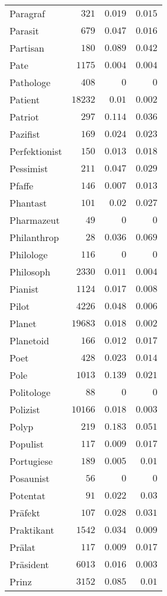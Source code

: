 \begin{supertabular}{lrrr}
Paragraf & $321$ & $0.019$ & $0.015$ \\
Parasit & $679$ & $0.047$ & $0.016$ \\
Partisan & $180$ & $0.089$ & $0.042$ \\
Pate & $1175$ & $0.004$ & $0.004$ \\
Pathologe & $408$ & $0$ & $0$ \\
Patient & $18232$ & $0.01$ & $0.002$ \\
Patriot & $297$ & $0.114$ & $0.036$ \\
Pazifist & $169$ & $0.024$ & $0.023$ \\
Perfektionist & $150$ & $0.013$ & $0.018$ \\
Pessimist & $211$ & $0.047$ & $0.029$ \\
Pfaffe & $146$ & $0.007$ & $0.013$ \\
Phantast & $101$ & $0.02$ & $0.027$ \\
Pharmazeut & $49$ & $0$ & $0$ \\
Philanthrop & $28$ & $0.036$ & $0.069$ \\
Philologe & $116$ & $0$ & $0$ \\
Philosoph & $2330$ & $0.011$ & $0.004$ \\
Pianist & $1124$ & $0.017$ & $0.008$ \\
Pilot & $4226$ & $0.048$ & $0.006$ \\
Planet & $19683$ & $0.018$ & $0.002$ \\
Planetoid & $166$ & $0.012$ & $0.017$ \\
Poet & $428$ & $0.023$ & $0.014$ \\
Pole & $1013$ & $0.139$ & $0.021$ \\
Politologe & $88$ & $0$ & $0$ \\
Polizist & $10166$ & $0.018$ & $0.003$ \\
Polyp & $219$ & $0.183$ & $0.051$ \\
Populist & $117$ & $0.009$ & $0.017$ \\
Portugiese & $189$ & $0.005$ & $0.01$ \\
Posaunist & $56$ & $0$ & $0$ \\
Potentat & $91$ & $0.022$ & $0.03$ \\
Präfekt & $107$ & $0.028$ & $0.031$ \\
Praktikant & $1542$ & $0.034$ & $0.009$ \\
Prälat & $117$ & $0.009$ & $0.017$ \\
Präsident & $6013$ & $0.016$ & $0.003$ \\
Prinz & $3152$ & $0.085$ & $0.01$ \\

\end{supertabular}

